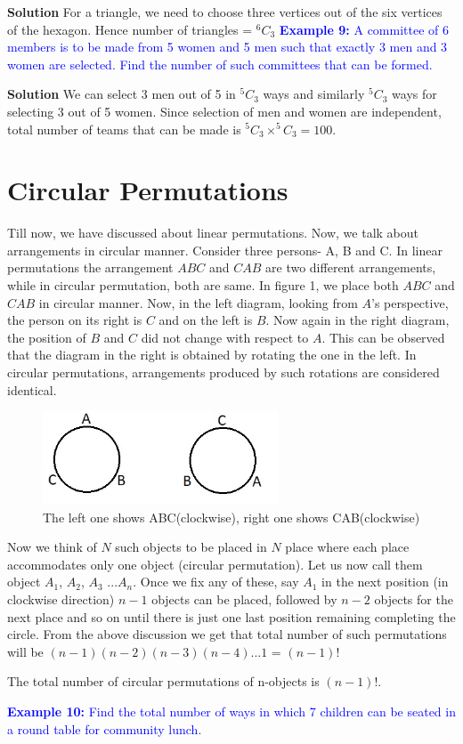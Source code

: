 \documentclass[12pt, a4paper]{article}
\begin{document}
\textbf{Solution} For a triangle, we need to choose three vertices out of the six vertices of the hexagon. Hence number of triangles = $^6C_3$ \newline
\textcolor{blue}{\textbf{Example 9:} A committee of 6 members is to be made from 5 women and 5 men such that exactly 3 men and 3 women are selected. Find the number of such committees that can be formed.}

\textbf{Solution} We can select 3 men out of 5 in $^5C_3$ ways and similarly $^5C_3$ ways for selecting 3 out of 5 women. Since selection of men and women are independent, total number of teams that can be made is $^{5}C_{3} \times ^{5}C_{3} = 100$.
\section{Circular Permutations}
Till now, we have discussed about linear permutations. Now, we talk about arrangements in circular manner. Consider three persons- A, B and C. In linear permutations the arrangement $ABC$ and $CAB$ are two different arrangements, while in circular permutation, both are same. In figure 1, we place both $ABC$ and $CAB$ in circular manner. Now, in the left diagram, looking from $A$'s perspective, the person on its right is $C$ and on the left is $B$. Now again in the right diagram, the position of $B$ and $C$ did not change with respect to $A$. This can be observed that the diagram in the right is obtained by rotating the one in the left. In circular permutations, arrangements produced by such rotations are considered identical.
\begin{figure}
    \centering
    \includegraphics[width=7cm]{images/PnCcircularpermu}
    \caption{The left one shows ABC(clockwise), right one shows CAB(clockwise)}
\end{figure} 
Now we think of $N$ such objects to be placed in $N$ place where each place accommodates only one object (circular permutation). Let us now call them object $A_{1}$, $A_{2}$, $A_3$ ...$A_n$. Once we fix any of these, say $A_1$ in the next position (in clockwise direction) $n-1$ objects can be placed, followed by $n-2$ objects for the next place and so on until there is just one last position remaining completing the circle. From the above discussion we get that total number of such permutations will be $(n-1)(n-2)(n-3)(n-4)$...$1$ = $(n-1)!$ 
\begin{tcolorbox}[colback=TealBlue!10!White,colframe=TealBlue!50!black]
The total number of circular permutations of n-objects is $(n-1)!$.
\end{tcolorbox}
\textcolor{blue}{\textbf{Example 10:} Find the total number of ways in which 7 children can be seated in a round table for community lunch.}
\end{document}

